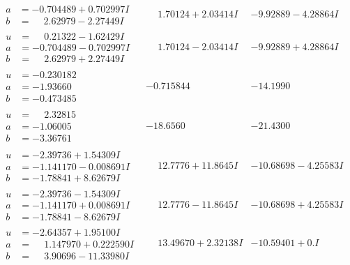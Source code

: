\documentclass[1p]{elsarticle_modified}
\theoremstyle{definition}
\begin{document}
$$\begin{array}{c|c|c}
\begin{aligned}
a &= -0.704489 + 0.702997 I \\
b &= \phantom{-}2.62979 - 2.27449 I\end{aligned}
 & \phantom{-}1.70124 + 2.03414 I & -9.92889 - 4.28864 I \\ \hline\begin{aligned}
u &= \phantom{-}0.21322 - 1.62429 I \\
a &= -0.704489 - 0.702997 I \\
b &= \phantom{-}2.62979 + 2.27449 I\end{aligned}
 & \phantom{-}1.70124 - 2.03414 I & -9.92889 + 4.28864 I \\ \hline\begin{aligned}
u &= -0.230182\phantom{ +0.000000I} \\
a &= -1.93660\phantom{ +0.000000I} \\
b &= -0.473485\phantom{ +0.000000I}\end{aligned}
 & -0.715844\phantom{ +0.000000I} & -14.1990\phantom{ +0.000000I} \\ \hline\begin{aligned}
u &= \phantom{-}2.32815\phantom{ +0.000000I} \\
a &= -1.06005\phantom{ +0.000000I} \\
b &= -3.36761\phantom{ +0.000000I}\end{aligned}
 & -18.6560\phantom{ +0.000000I} & -21.4300\phantom{ +0.000000I} \\ \hline\begin{aligned}
u &= -2.39736 + 1.54309 I \\
a &= -1.141170 - 0.008691 I \\
b &= -1.78841 + 8.62679 I\end{aligned}
 & \phantom{-}12.7776 + 11.8645 I & -10.68698 - 4.25583 I \\ \hline\begin{aligned}
u &= -2.39736 - 1.54309 I \\
a &= -1.141170 + 0.008691 I \\
b &= -1.78841 - 8.62679 I\end{aligned}
 & \phantom{-}12.7776 - 11.8645 I & -10.68698 + 4.25583 I \\ \hline\begin{aligned}
u &= -2.64357 + 1.95100 I \\
a &= \phantom{-}1.147970 + 0.222590 I \\
b &= \phantom{-}3.90696 - 11.33980 I\end{aligned}
 & \phantom{-}13.49670 + 2.32138 I & -10.59401 + 0. I\phantom{ +0.000000I} \\ \hline\begin{aligned}

\end{aligned}
\end{array}$$
\end{document}
